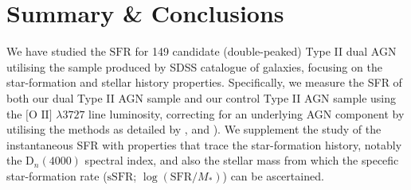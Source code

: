 \section{Summary \& Conclusions}

We have studied the $\text{SFR}$ for 149 candidate (double-peaked) Type II dual AGN utilising the sample produced by \cite{Liu_2009} SDSS catalogue of galaxies, focusing on the star-formation and stellar history properties. Specifically, we measure the SFR of both our dual Type II AGN sample and our control Type II AGN sample using the $\text{[O II]}$ $\lambda3727$ line luminosity, correcting for an underlying AGN component by utilising the methods as detailed by \cite{Ho_2005}, \cite{Kim_2006} and \cite{Silverman_2009}). We supplement the study of the instantaneous SFR with properties that trace the star-formation history, notably the $\text{D}_{n}(4000)$ spectral index, and also the stellar mass from which the specefic star-formation rate ($\text{sSFR}$; $\log{(\text{SFR}/M_{*})}$) can be ascertained.    
  
  
  
  
  